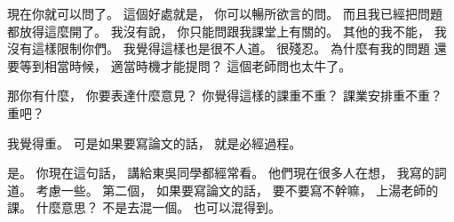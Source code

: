 \hypertarget{w01:cue:3297}{}現在你就可以問了。
\hypertarget{w01:cue:3298}{}這個好處就是，
\hypertarget{w01:cue:3299}{}你可以暢所欲言的問。
\hypertarget{w01:cue:3300}{}而且我已經把問題
\hypertarget{w01:cue:3301}{}都放得這麼開了。
\hypertarget{w01:cue:3302}{}我沒有說，
\hypertarget{w01:cue:3303}{}你只能問跟我課堂上有關的。
\hypertarget{w01:cue:3304}{}其他的我不能，
\hypertarget{w01:cue:3305}{}我沒有這樣限制你們。
\hypertarget{w01:cue:3306}{}我覺得這樣也是很不人道。
\hypertarget{w01:cue:3307}{}很殘忍。
\hypertarget{w01:cue:3308}{}為什麼有我的問題
\hypertarget{w01:cue:3309}{}還要等到相當時候，
\hypertarget{w01:cue:3310}{}適當時機才能提問？
\hypertarget{w01:cue:3311}{}這個老師問也太牛了。

\hypertarget{w01:cue:3312}{}那你有什麼，
\hypertarget{w01:cue:3313}{}你要表達什麼意見？
\hypertarget{w01:cue:3314}{}你覺得這樣的課重不重？
\hypertarget{w01:cue:3315}{}課業安排重不重？
\hypertarget{w01:cue:3316}{}重吧？

\hypertarget{w01:cue:3317}{}我覺得重。
\hypertarget{w01:cue:3318}{}可是如果要寫論文的話，
\hypertarget{w01:cue:3319}{}就是必經過程。

\hypertarget{w01:cue:3320}{}是。
\hypertarget{w01:cue:3321}{}你現在這句話，
\hypertarget{w01:cue:3322}{}講給東吳同學都經常看。
\hypertarget{w01:cue:3323}{}他們現在很多人在想，
\hypertarget{w01:cue:3324}{}我寫的詞道。
\hypertarget{w01:cue:3325}{}考慮一些。
\hypertarget{w01:cue:3326}{}第二個，
\hypertarget{w01:cue:3327}{}如果要寫論文的話，
\hypertarget{w01:cue:3328}{}要不要寫不幹嘛，
\hypertarget{w01:cue:3329}{}上湯老師的課。
\hypertarget{w01:cue:3330}{}什麼意思？
\hypertarget{w01:cue:3331}{}不是去混一個。
\hypertarget{w01:cue:3332}{}也可以混得到。

